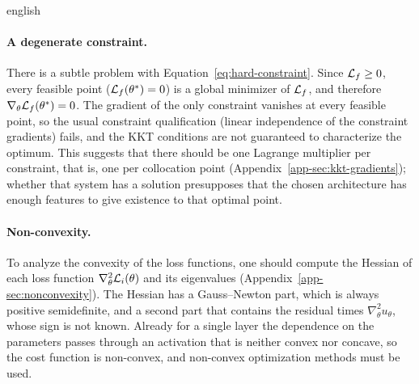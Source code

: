 \begin{hyphenrules}{english}
\paragraph{A degenerate constraint.}
There is a subtle problem with Equation~\eqref{eq:hard-constraint}. Since $\mathcal{L}_f\ge0$, every feasible point
($\mathcal{L}_f(\theta^{*})=0$) is a global minimizer of $\mathcal{L}_f$, and therefore $\nabla_\theta\mathcal{L}_f(\theta^{*})=0$.
The gradient of the only constraint vanishes at every feasible point, so the usual constraint
qualification (linear independence of the constraint gradients) fails, and the KKT conditions are not
guaranteed to characterize the optimum. This suggests that there should be one Lagrange multiplier per constraint, that is,
one per collocation point (Appendix~\ref{app-sec:kkt-gradients}); whether that system has a solution
presupposes that the chosen architecture has enough features to give existence to that optimal point.

\paragraph{Non-convexity.}
To analyze the convexity of the loss functions, one should compute the Hessian of each loss function
$\nabla^2_\theta\mathcal{L}_i(\theta)$ and its eigenvalues (Appendix~\ref{app-sec:nonconvexity}). The Hessian has
a Gauss--Newton part, which is always positive semidefinite, and a second part that contains the
residual times $\nabla^2_\theta u_\theta$, whose sign is not known. Already for a single layer the
dependence on the parameters passes through an activation that is neither convex nor concave, so the
cost function is non-convex, and non-convex optimization methods must be used.


\end{hyphenrules}
